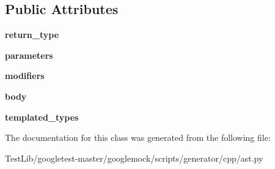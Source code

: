 \subsection*{Public Attributes}
\begin{DoxyCompactItemize}
\item 
\mbox{\label{classcpp_1_1ast_1_1Function_af750fd788d7ab33163ee066534780212}} 
{\bfseries return\+\_\+type}
\item 
\mbox{\label{classcpp_1_1ast_1_1Function_a0e61ef47af9cf2fd4402dbd8cab631ef}} 
{\bfseries parameters}
\item 
\mbox{\label{classcpp_1_1ast_1_1Function_ad30eed435f1ff9ff34ade9cc0d7be121}} 
{\bfseries modifiers}
\item 
\mbox{\label{classcpp_1_1ast_1_1Function_a8e25e5016b23b38e32acf2df529c0650}} 
{\bfseries body}
\item 
\mbox{\label{classcpp_1_1ast_1_1Function_a57bb03218bade3240137a0d91c467cb6}} 
{\bfseries templated\+\_\+types}
\end{DoxyCompactItemize}


The documentation for this class was generated from the following file\+:\begin{DoxyCompactItemize}
\item 
Test\+Lib/googletest-\/master/googlemock/scripts/generator/cpp/ast.\+py\end{DoxyCompactItemize}
